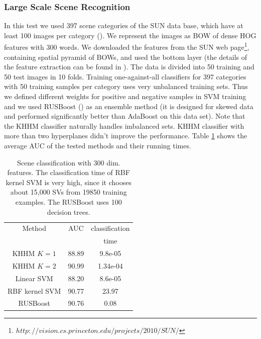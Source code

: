 \documentclass[twoside,11pt]{article}
\begin{document}
\subsubsection {Large Scale Scene Recognition}
\label{sub:SUN}

In this test we used 397 scene categories of the SUN data base, which have at least 100 images per  category (\cite{SUN}). We represent the images as BOW of dense HOG features with 300 words. We downloaded the features from the SUN web page\footnote{$http://vision.cs.princeton.edu/projects/2010/SUN/$}, containing spatial pyramid of BOWs, and used the bottom layer (the details of the feature extraction can be found in \cite{SUN}).  The data is divided into 50 training and 50 test images in 10 folds. Training one-against-all classifiers for 397 categories with 50 training samples per category uses very unbalanced training sets. Thus we defined different weights for positive and negative samples in SVM training and we used RUSBoost (\cite{RUSboost}) as an ensemble method (it is designed for skewed data and performed significantly better than AdaBoost on this data set). Note that the KHHM classifier naturally handles imbalanced sets. KHHM classifier with more than two hyperplanes didn't improve the performance. Table \ref{SUN300} shows the average AUC of the tested methods and their running times.
\begin{table}
\label{SUN300}
\center
\begin{tabular}{|c|c|c|}
  \hline
  Method & AUC  & classification \\
  & &time\\
   \hline
  KHHM $K=1$  & 88.89 & 9.8e-05\\
  KHHM $K=2$ & 90.99 & 1.34e-04  \\
  Linear SVM             & 88.20 & 8.6e-05  \\
  RBF kernel SVM         & 90.77 & 23.97\\
  RUSBoost               &90.76  &0.08  \\
  \hline
\end{tabular}
\caption{Scene classification with 300 dim. features. The classification time of RBF kernel SVM is very high, since it chooses about 15,000 SVs from 19850 training examples. The RUSBoost uses 100 decision trees.}
\end{table}
\end{document}
